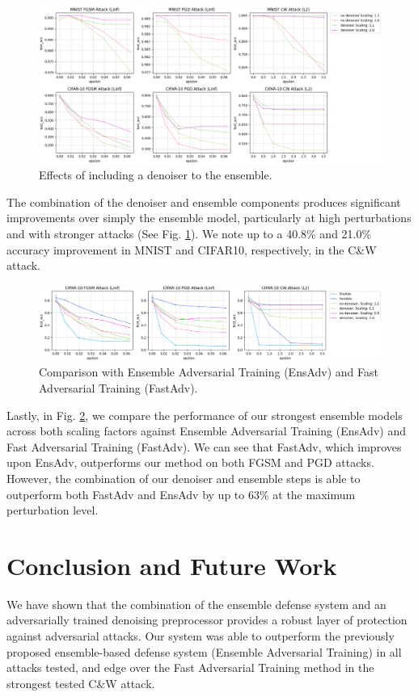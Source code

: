 \documentclass[10pt,journal,compsoc]{IEEEtran}
\begin{document}
\begin{figure}[!h]
\centering
    \includegraphics[scale=0.45]{images/denoiser_comparison.png}
    \caption{Effects of including a denoiser to the ensemble.}
    \label{fig:denoisercomp}
\end{figure}
The combination of the denoiser and ensemble components produces significant improvements over simply the ensemble model, particularly at high perturbations and with stronger attacks (See Fig. \ref{fig:denoisercomp}). We note up to a 40.8\% and 21.0\% accuracy improvement in MNIST and CIFAR10, respectively, in the C\&W attack.

\begin{figure}[!h]
\centering
    \includegraphics[scale=0.45]{images/comparison.png}
    \caption{Comparison with Ensemble Adversarial Training (EnsAdv) and Fast Adversarial Training (FastAdv).}
    \label{fig:comparison}
\end{figure}
Lastly, in Fig. \ref{fig:comparison}, we compare the performance of our strongest ensemble models across both scaling factors against Ensemble Adversarial Training (EnsAdv) and Fast Adversarial Training (FastAdv). We can see that FastAdv, which improves upon EnsAdv, outperforms our method on both FGSM and PGD attacks. However, the combination of our denoiser and ensemble steps is able to outperform both FastAdv and EnsAdv by up to 63\% at the maximum perturbation level.


\section{Conclusion and Future Work} %
We have shown that the combination of the ensemble defense system and an adversarially trained denoising preprocessor provides a robust layer of protection against adversarial attacks. Our system was able to outperform the previously proposed ensemble-based defense system (Ensemble Adversarial Training) in all attacks tested, and edge over the Fast Adversarial Training method in the strongest tested C\&W attack.
\end{document}
